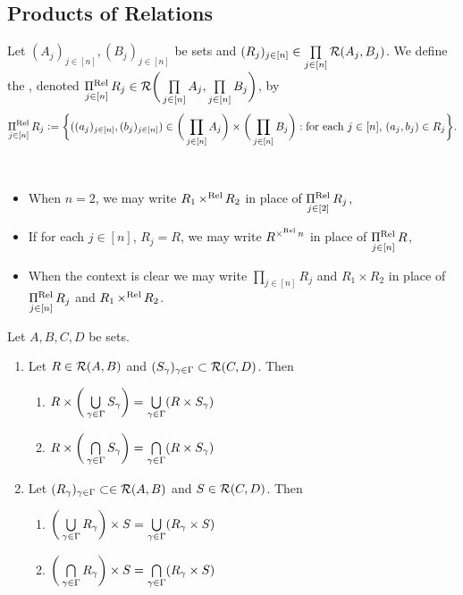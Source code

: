 \subsection{Products of Relations}

\begin{defn}
	Let $(A_j)_{j \in [n]}, (B_j)_{j \in [n]}$ be sets and $(R_j)_{j \in [n]} \in \prod\limits_{j \in [n]} \mathcal{R}(A_j,B_j)$. We define the , denoted $\operatorname*{\Pi^{\text{Rel}}}\limits_{j \in [n]} R_j \in \mathcal{R} \bigg( \prod\limits_{j \in [n]} A_j, \prod\limits_{j \in [n]} B_j \bigg)$, by 
	$$ \operatorname*{\Pi^{\text{Rel}}}\limits_{j \in [n]} R_j \vcentcolon= \bigg \{ ((a_j)_{j \in [n]}, (b_j)_{j \in [n]}) \in \bigg( \prod\limits_{j \in [n]} A_j \bigg) \times \bigg( \prod\limits_{j \in [n]} B_j \bigg): \text{for each $j \in [n]$, $(a_j,b_j) \in R_j$} \bigg \}.$$
\end{defn}

\begin{note}\
	\begin{itemize}
		\item When $n = 2$, we may write $R_1 \operatorname*{\times^{\text{Rel}}} R_2$ in place of $\operatorname*{\Pi^{\text{Rel}}}\limits_{j \in [2]} R_j$,
		\item If for each $j \in [n]$, $R_j = R$, we may write $R^{\operatorname*{\times^{\text{Rel}}} n}$ in place of $\operatorname*{\Pi^{\text{Rel}}}\limits_{j \in [n]} R$,
		\item When the context is clear we may write $\prod\limits_{j \in [n]} R_j$ and $R_1 \times R_2$ in place of $\operatorname*{\Pi^{\text{Rel}}}\limits_{j \in [n]} R_j$ and $R_1 \operatorname*{\times^{\text{Rel}}} R_2$.
	\end{itemize}
\end{note}

\begin{ex}
	Let $A,B,C,D$ be sets.
	\begin{enumerate}
		\item Let $R \in \mathcal{R}(A,B)$ and $(S_{\gamma})_{\gamma \in \Gamma} \subset \mathcal{R}(C,D)$. Then 
		\begin{enumerate}
			\item $R \times \bigg(\bigcup\limits_{\gamma \in \Gamma} S_{\gamma} \bigg) = \bigcup\limits_{\gamma \in \Gamma} (R \times S_{\gamma})$
			\item $R \times \bigg(\bigcap\limits_{\gamma \in \Gamma} S_{\gamma} \bigg) = \bigcap\limits_{\gamma \in \Gamma} (R \times S_{\gamma})$
		\end{enumerate}
		\item Let $(R_{\gamma})_{\gamma \in \Gamma} \subset \in \mathcal{R}(A,B)$ and $S \in \mathcal{R}(C,D)$. Then 
		\begin{enumerate}
			\item $\bigg(\bigcup\limits_{\gamma \in \Gamma} R_{\gamma} \bigg) \times S = \bigcup\limits_{\gamma \in \Gamma} (R_{\gamma} \times S)$
			\item $\bigg(\bigcap\limits_{\gamma \in \Gamma} R_{\gamma} \bigg) \times S = \bigcap\limits_{\gamma \in \Gamma} (R_{\gamma} \times S)$
		\end{enumerate}
	\end{enumerate}
\end{ex}

